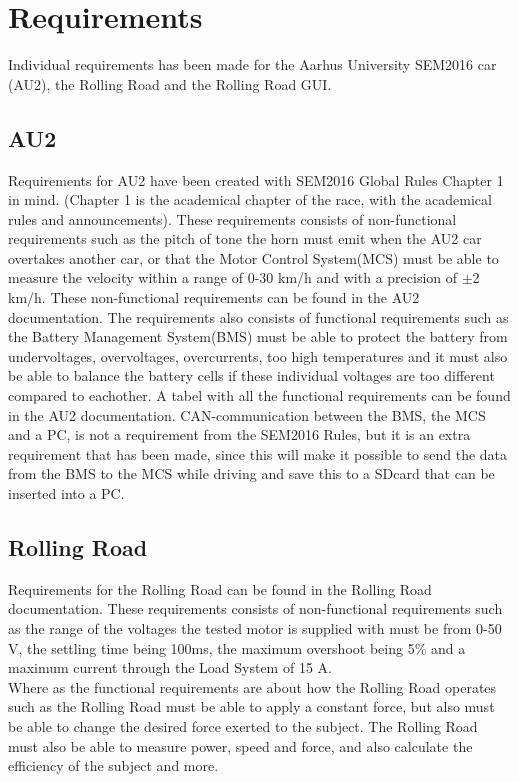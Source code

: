 \chapter{Requirements}
Individual requirements has been made for the Aarhus University SEM2016 car (AU2), the Rolling Road and the Rolling Road GUI.

\section{AU2}
Requirements for AU2 have been created with SEM2016 Global Rules Chapter 1 in mind. (Chapter 1 is the academical chapter of the race, with the academical rules and announcements). These requirements consists of non-functional requirements such as the pitch of tone the horn must emit when the AU2 car overtakes another car, or that the Motor Control System(MCS) must be able to measure the velocity within a range of 0-30 km/h and with a precision of $\pm$2 km/h. These non-functional requirements can be found in the AU2 documentation. The requirements also consists of functional requirements such as the Battery Management System(BMS) must be able to protect the battery from undervoltages, overvoltages, overcurrents, too high temperatures and it must also be able to balance the battery cells if these individual voltages are too different compared to eachother. A tabel with all the functional requirements can be found in the AU2 documentation. CAN-communication between the BMS, the MCS and a PC, is not a requirement from the SEM2016 Rules, but it is an extra requirement that has been made, since this will make it possible to send the data from the BMS to the MCS while driving and save this to a SDcard that can be inserted into a PC.

\section{Rolling Road}
Requirements for the Rolling Road can be found in the Rolling Road documentation.
These requirements consists of non-functional requirements such as the range of the voltages the tested motor is supplied with must be from 0-50 V, the settling time being 100ms, the maximum overshoot being 5\% and a maximum current through the Load System of 15 A.\\
Where as the functional requirements are about how the Rolling Road operates such as the Rolling Road must be able to apply a constant force, but also must be able to change the desired force exerted to the subject. The Rolling Road must also be able to measure power, speed and force, and also calculate the efficiency of the subject and more.

